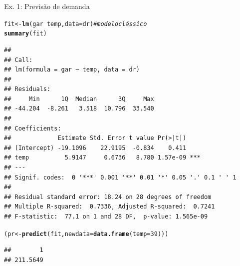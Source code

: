\documentclass{beamer}\usepackage[]{graphicx}\usepackage[]{xcolor}
\makeatletter
\newcommand{\hlnum}[1]{\textcolor[rgb]{0.686,0.059,0.569}{#1}}%
\newcommand{\hlcom}[1]{\textcolor[rgb]{0.678,0.584,0.686}{\textit{#1}}}%
\newcommand{\hlopt}[1]{\textcolor[rgb]{0,0,0}{#1}}%
\newcommand{\hldef}[1]{\textcolor[rgb]{0.345,0.345,0.345}{#1}}%
\newcommand{\hlkwb}[1]{\textcolor[rgb]{0.69,0.353,0.396}{#1}}%
\newcommand{\hlkwc}[1]{\textcolor[rgb]{0.333,0.667,0.333}{#1}}%
\newcommand{\hlkwd}[1]{\textcolor[rgb]{0.737,0.353,0.396}{\textbf{#1}}}%
\newenvironment{kframe}{%
 \def\at@end@of@kframe{}%
 \ifinner\ifhmode%
  \def\at@end@of@kframe{\end{minipage}}%
  \begin{minipage}{\columnwidth}%
 \fi\fi%
 \def\FrameCommand##1{\hskip\@totalleftmargin \hskip-\fboxsep
 \colorbox{shadecolor}{##1}\hskip-\fboxsep
     \hskip-\linewidth \hskip-\@totalleftmargin \hskip\columnwidth}%
 \MakeFramed {\advance\hsize-\width
   \@totalleftmargin\z@ \linewidth\hsize
   \@setminipage}}%
 {\par\unskip\endMakeFramed%
 \at@end@of@kframe}
\newenvironment{knitrout}{}{} %
\makeatother
\begin{document}
\begin{frame}[fragile]{Ex. 1: Previsão de demanda}
\fontsize{8pt}{8pt}\selectfont
\begin{knitrout}
\color{fgcolor}\begin{kframe}
\begin{alltt}
\hldef{fit} \hlkwb{<-} \hlkwd{lm}\hldef{(gar} \hlopt{~} \hldef{temp,} \hlkwc{data} \hldef{= dr)} \hlcom{# modelo clássico}
\hlkwd{summary}\hldef{(fit)}
\end{alltt}
\begin{verbatim}
## 
## Call:
## lm(formula = gar ~ temp, data = dr)
## 
## Residuals:
##     Min      1Q  Median      3Q     Max 
## -44.204  -8.261   3.518  10.796  33.540 
## 
## Coefficients:
##             Estimate Std. Error t value Pr(>|t|)    
## (Intercept) -19.1096    22.9195  -0.834    0.411    
## temp          5.9147     0.6736   8.780 1.57e-09 ***
## ---
## Signif. codes:  0 '***' 0.001 '**' 0.01 '*' 0.05 '.' 0.1 ' ' 1
## 
## Residual standard error: 18.24 on 28 degrees of freedom
## Multiple R-squared:  0.7336,	Adjusted R-squared:  0.7241 
## F-statistic:  77.1 on 1 and 28 DF,  p-value: 1.565e-09
\end{verbatim}
\begin{alltt}
\hldef{(pr} \hlkwb{<-} \hlkwd{predict}\hldef{(fit,} \hlkwc{newdata} \hldef{=} \hlkwd{data.frame}\hldef{(}\hlkwc{temp} \hldef{=} \hlnum{39}\hldef{)))}
\end{alltt}
\begin{verbatim}
##        1 
## 211.5649
\end{verbatim}
\end{kframe}
\end{knitrout}
\end{frame}
\end{document}
